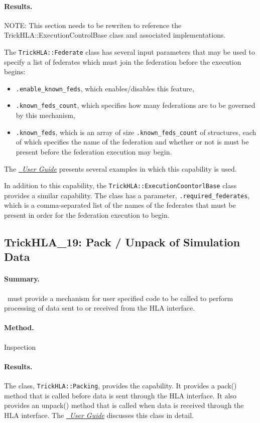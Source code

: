 \paragraph{Results.}
NOTE: This section needs to be rewriten to reference the
TrickHLA::ExecutionControlBase class and associated implementations.

The {\tt TrickHLA::Federate} class has several input parameters that
may be used to specify a list of federates which must join the federation
before the execution begins:
\begin{itemize}
\item{
  {\tt .enable\_known\_feds}, which enables/disables this feature,
}
\item{
  {\tt .known\_feds\_count}, which specifies how many federations are
  to be governed by this mechanism,
}
\item{
  {\tt .known\_feds}, which is an array of size
  {\tt .known\_feds\_count} of structures, each of which specifies
  the name of the federation and whether or not is must be present
  before the federation execution may begin.
}
\end{itemize}
The \href{file:TrickHLAUser.pdf} {\em \TrickHLA\ User Guide}
presents several examples in which this capability
is used.

In addition to this capability, the {\tt TrickHLA::ExecutionCoontorlBase}
class provides a similar capability.
The class has a parameter, {\tt .required\_federates}, which is a
comma-separated list of the names of the federates that must be
present in order for the federation execution to begin.

\subsection{TrickHLA\_19: Pack / Unpack of Simulation Data}
\paragraph{Summary.}
\TrickHLA\ must provide a mechanism for user specified code to be called to
perform processing of data sent to or received from the HLA interface.
\paragraph{Method.} Inspection
\paragraph{Results.}
The class, {\tt TrickHLA::Packing}, provides the capability. It provides a
pack() method that is called before data is sent through the HLA interface. 
It also provides an unpack() method that is called when data is received 
through the HLA interface.
The \href{file:TrickHLAUser.pdf} {\em \TrickHLA\ User Guide}
discusses this class in detail.

